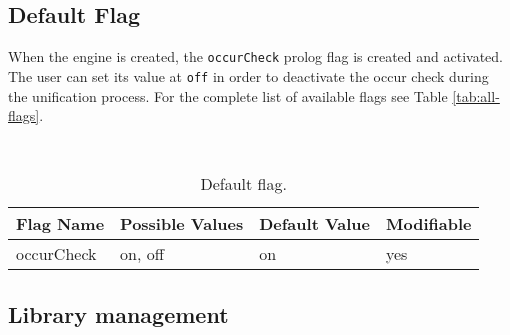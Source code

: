 \subsection{Default Flag}

When the engine is created, the \texttt{occurCheck} prolog flag is created and activated. The user can set its value at \texttt{off} in order to deactivate
the occur check during the unification process. For the complete list of available flags see Table \ref{tab:all-flags}.

\begin{table}[h]
	\begin{center}{\small\tt
			\begin{tabular}{p{4.8cm}|p{2.2cm}|p{2.2cm}|p{1.8cm}}\hline\hline
				Flag Name   & Possible Values & Default Value & Modifiable\\ \hline\hline
				occurCheck          & {on, off}          &  on       & yes\\\hline\hline
			\end{tabular}
		}\end{center}
		\caption{Default flag.}
\end{table}

\subsection{Library management}
\label{ssec:library-management}

